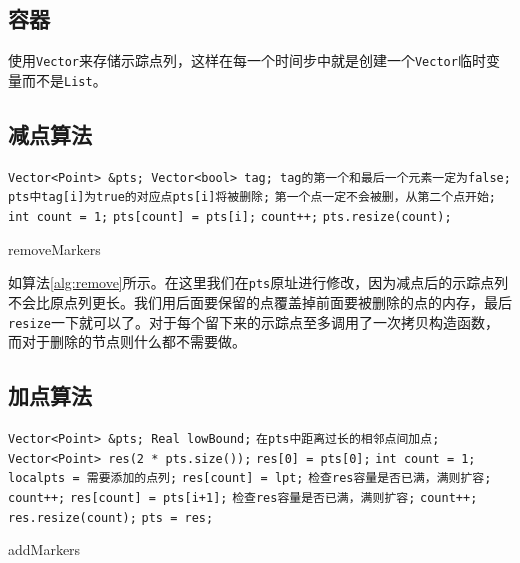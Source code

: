 \documentclass[a4paper,twoside]{ctexart}
\begin{document}
\subsection{容器}
使用\texttt{Vector}来存储示踪点列，这样在每一个时间步中就是创建一个\texttt{Vector}临时变量而不是\texttt{List}。
\vspace{-1em}
\subsection{减点算法}
\begin{algorithm}[h]
  \begin{algorithmic}[1]
	\Require
    \texttt{Vector<Point> \&pts; Vector<bool> tag; tag的第一个和最后一个元素一定为false;}
  \Ensure
	  \texttt{pts中tag[i]为true的对应点pts[i]将被删除;}
  \State \texttt{第一个点一定不会被删，从第二个点开始;}
  \State \texttt{int count = 1;}
        \State \texttt{pts[count] = pts[i];}
      \EndIf
      \State \texttt{count++;}
    \EndIf
  \EndFor
  \State \texttt{pts.resize(count);}
  \end{algorithmic}
 	\caption{removeMarkers}
 	\label{alg:remove} 
\end{algorithm} 

如算法\ref{alg:remove}所示。在这里我们在\texttt{pts}原址进行修改，因为减点后的示踪点列不会比原点列更长。我们用后面要保留的点覆盖掉前面要被删除的点的内存，最后\texttt{resize}一下就可以了。对于每个留下来的示踪点至多调用了一次拷贝构造函数，而对于删除的节点则什么都不需要做。
\vspace{-1em}
\subsection{加点算法}
\begin{algorithm}[h]
  \begin{algorithmic}[1]
    \Require
      \texttt{Vector<Point> \&pts; Real lowBound;}
	  \Ensure
      \texttt{在pts中距离过长的相邻点间加点;}
    \State \texttt{Vector<Point> res(2 * pts.size());}
    \State \texttt{res[0] = pts[0];}
    \State \texttt{int count = 1;}
       \State \texttt{localpts = 需要添加的点列;}
          \State \texttt{res[count] = lpt;}
          \State \texttt{检查res容量是否已满，满则扩容;}
          \State \texttt{count++;}
        \EndFor
      \EndIf
      \State \texttt{res[count] = pts[i+1];}
      \State \texttt{检查res容量是否已满，满则扩容;}
      \State \texttt{count++;}
    \EndFor
    \State \texttt{res.resize(count);}
    \State \texttt{pts = res;}
  \end{algorithmic}
 	\caption{addMarkers}
 	\label{alg:split} 
\end{algorithm}
\end{document}

